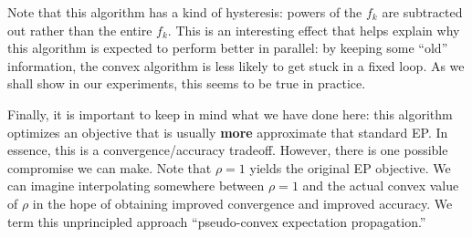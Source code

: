 \documentclass[times, 10pt,twocolumn]{article}
\begin{document}
Note that this algorithm has a kind of hysteresis: powers of the
$f_k$ are subtracted out rather than the entire $f_k$. This is an
interesting effect that helps explain why this algorithm is
expected to perform better in parallel: by keeping some ``old''
information, the convex algorithm is less likely to get stuck
in a fixed loop. As we shall show in our experiments, this seems to
be true in practice.

Finally, it is important to keep in mind what we have done here:
this algorithm optimizes an objective that is usually \textbf{more}
approximate that standard EP. In essence, this is a
convergence/accuracy tradeoff. However, there is one possible
compromise we can make. Note that $\rho = 1$ yields the original
EP objective. We can imagine interpolating somewhere between $\rho
= 1$ and the actual convex value of $\rho$ in the hope of obtaining
improved convergence and improved accuracy. We term this
unprincipled approach ``pseudo-convex expectation propagation.''
\end{document}
